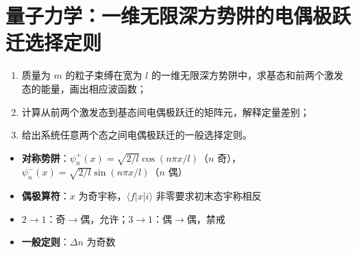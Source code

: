 \section{量子力学：一维无限深方势阱的电偶极跃迁选择定则}
\label{sec:1d-well-dipole-selection}

\begin{modelbox}[题目：一维无限深方势阱的电偶极跃迁选择定则]
\begin{enumerate}
    \item 质量为 $m$ 的粒子束缚在宽为 $l$ 的一维无限深方势阱中，求基态和前两个激发态的能量，画出相应波函数；
    \item 计算从前两个激发态到基态间电偶极跃迁的矩阵元，解释定量差别；
    \item 给出系统任意两个态之间电偶极跃迁的一般选择定则。
\end{enumerate}
\end{modelbox}

\begin{tipbox}[考点快速分析]
\begin{itemize}
    \item \textbf{对称势阱}：$\psi_n^+(x)=\sqrt{2/l}\cos(n\pi x/l)$（$n$ 奇），$\psi_n^-(x)=\sqrt{2/l}\sin(n\pi x/l)$（$n$ 偶）
    \item \textbf{偶极算符}：$x$ 为奇宇称，$\langle f|x|i\rangle$ 非零要求初末态宇称相反
    \item \textbf{$2\to1$}：奇$\to$偶，允许；\textbf{$3\to1$}：偶$\to$偶，禁戒
    \item \textbf{一般定则}：$\Delta n$ 为奇数
\end{itemize}
\end{tipbox}

